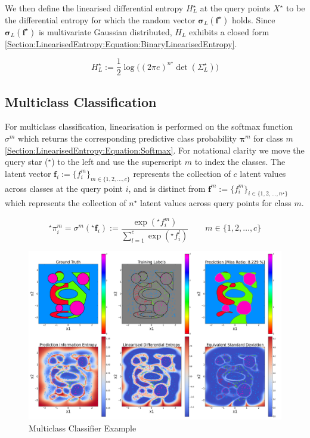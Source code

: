 \documentclass{article}
\renewcommand{\vec}[1]{\boldsymbol{#1}}
\begin{document}
			We then define the linearised differential entropy $H^{\star}_{L}$ at the query points $X^{\star}$ to be the differential entropy for which the random vector $\vec{\sigma}_{L}(\vec{f}^{\star})$ holds. Since $\vec{\sigma}_{L}(\vec{f}^{\star})$ is multivariate Gaussian distributed, $H_{L}$ exhibits a closed form \eqref{Section:LinearisedEntropy:Equation:BinaryLinearisedEntropy}.
			
			\begin{equation}
				H^{\star}_{L} := \frac{1}{2} \log\Big((2 \pi e)^{n^{\star}} \det(\Sigma^{\star}_{L})\Big)
			\label{Section:LinearisedEntropy:Equation:BinaryLinearisedEntropy}
			\end{equation}			


					
	\subsection{Multiclass Classification}
			
		For multiclass classification, linearisation is performed on the softmax function $\sigma^{m}$ which returns the corresponding predictive class probability $\vec{\pi}^{m}$ for class $m$ \eqref{Section:LinearisedEntropy:Equation:Softmax}. For notational clarity we move the query star ($^\star$) to the left and use the superscript $m$ to index the classes. The latent vector $\vec{f}_{i} := \{f^{m}_{i}\}_{m \in \{1, 2, \dots, c\}}$ represents the collection of $c$ latent values across classes at the query point $i$, and is distinct from $\vec{f}^{m} := \{f^{m}_{i}\}_{i \in \{1, 2, \dots, n^{\star}\}}$ which represents the collection of $n^{\star}$ latent values across query points for class $m$.

		\begin{equation}
			^{\star}\pi^{m}_{i} = \sigma^{m}(^{\star}\vec{f}_{i}) := \frac{\exp(^{\star}f^{m}_{i})}{\sum_{l = 1}^{c} \exp(^{\star}f^{l}_{i})} \qquad m \in \{1, 2, \dots, c\}
		\label{Section:LinearisedEntropy:Equation:Softmax}
		\end{equation}
			
		\begin{figure}[!htbp]
		\centering
			\includegraphics[width = \linewidth]{Figures/multiclass_linearised_entropy_horizontal/Figure1.png}
		\caption{Multiclass Classifier Example}
		\label{Figure:Results:MulticlassLinearisedEntropy}
		\end{figure}
		
\end{document}
